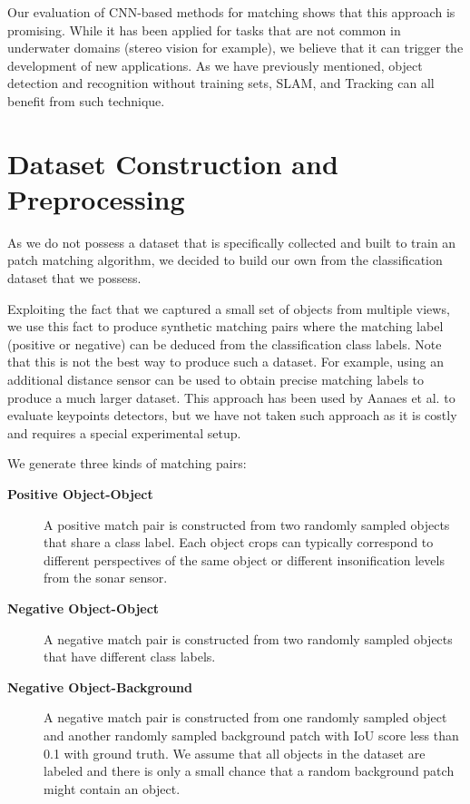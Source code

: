 Our evaluation of CNN-based methods for matching shows that this approach is promising. While it has been applied for tasks that are not common in underwater domains (stereo vision for example), we believe that it can trigger the development of new applications. As we have previously mentioned, object detection and recognition without training sets, SLAM, and Tracking can all benefit from such technique.

\section{Dataset Construction and Preprocessing}

As we do not possess a dataset that is specifically collected and built to train an patch matching algorithm, we decided to build our own from the classification dataset that we possess.

Exploiting the fact that we captured a small set of objects from multiple views, we use this fact to produce synthetic matching pairs where the matching label (positive or negative) can be deduced from the classification class labels. Note that this is not the best way to produce such a dataset. For example, using an additional distance sensor can be used to obtain precise matching labels to produce a much larger dataset. This approach has been used by Aanaes et al. \cite{aanaes2012interesting} to evaluate keypoints detectors, but we have not taken such approach as it is costly and requires a special experimental setup.

We generate three kinds of matching pairs:

\begin{description}
	\item[\textbf{Positive Object-Object}] A positive match pair is constructed from two randomly sampled objects that share a class label. Each object crops can typically correspond to different perspectives of the same object or different insonification levels from the sonar sensor.
	\item[\textbf{Negative Object-Object}] A negative match pair is constructed from two randomly sampled objects that have different class labels.
	\item[\textbf{Negative Object-Background}] A negative match pair is constructed from one randomly sampled object and another randomly sampled background patch with IoU score less than 0.1 with ground truth. We assume that all objects in the dataset are labeled and there is only a small chance that a random background patch might contain an object.
\end{description}

